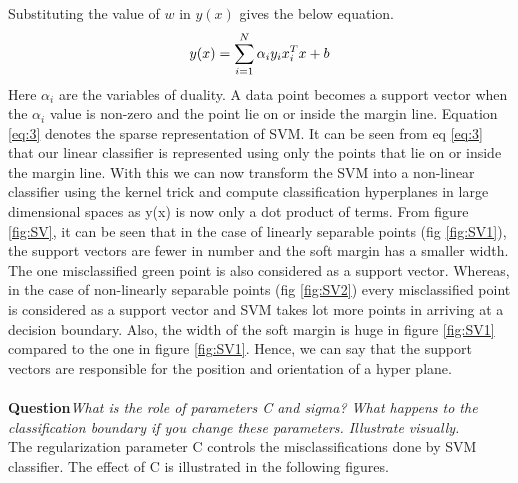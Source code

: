 \documentclass[12pt]{report}
\begin{document}
{	Substituting the value of $w$ in $y(x)$ gives the below equation.
	 \begin{equation}\label{eq:3}
	\centering
	y(x)=\sum_{i=1}^{N} \alpha_i y_i x_i^T x+b
	\end{equation}
	Here $\alpha_i$ are the variables of duality. A data point becomes a support vector when the $\alpha_i$ value is non-zero and the point lie on or inside the margin line. Equation \ref{eq:3} denotes the sparse representation of SVM.
	It can be seen from eq \ref{eq:3} that our linear classifier is represented using only the points that lie on or inside the margin line. With this we can now  transform the  SVM into a non-linear classifier using the kernel trick and compute classification hyperplanes in large dimensional spaces as y(x) is now only a dot product of terms.  From figure \ref{fig:SV}, it can be seen that in the case of linearly separable points (fig \ref{fig:SV1}), the support vectors are fewer in number and the soft margin has a smaller width. The one misclassified green point is also considered as a support vector. Whereas, in the case of non-linearly separable points (fig \ref{fig:SV2}) every misclassified point is considered as a support vector and SVM takes lot more points in arriving at a decision boundary. Also, the width of the soft margin is huge in figure \ref{fig:SV1} compared to the one in figure \ref{fig:SV1}. Hence, we can say that the support vectors are responsible for the position and orientation of a hyper plane.\\\\
{\bf Question}\textit{What is the role of parameters C and sigma? What happens to the classification boundary if you change these parameters. Illustrate visually.}\\
The regularization parameter C controls the misclassifications done by SVM classifier. The effect of C is illustrated in the following figures.


}
\end{document}

